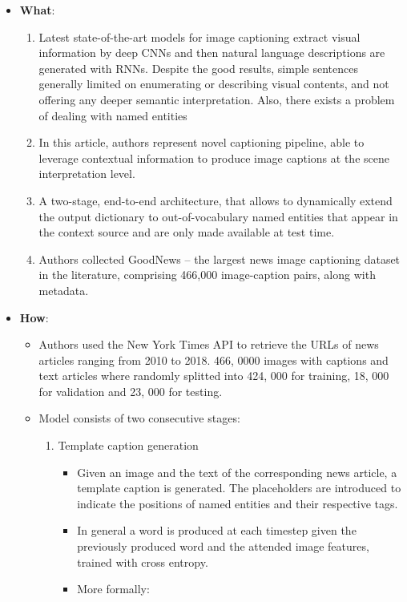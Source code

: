 \documentclass[11pt]{article}
\begin{document}
     \begin{itemize}
     	\item \textbf{What}:
       \begin{enumerate}
			\item Latest state-of-the-art models for image captioning extract visual information by deep CNNs and then natural language descriptions are generated with RNNs. Despite the good results, simple sentences generally limited on enumerating or describing visual contents, and not offering any deeper semantic interpretation. Also, there exists a problem of dealing with named entities
			\item In this article, authors represent novel captioning pipeline, able to leverage contextual information to produce image captions at the scene interpretation level.
			\item A two-stage, end-to-end architecture, that allows to dynamically extend the output dictionary to out-of-vocabulary named entities that appear in the context source and are only made available at test time.
			\item Authors collected GoodNews -- the largest news image captioning dataset in the literature, comprising 466,000 image-caption pairs, along with metadata. 
       \end{enumerate}
        \item \textbf{How}:
       \begin{itemize}
			\item  Authors used the New York Times API to retrieve the URLs of news articles ranging from 2010 to 2018. 466, 0000 images with captions and text articles where randomly splitted into 424, 000 for training, 18, 000 for validation and 23, 000 for testing. 
			\item Model consists of two consecutive stages:
			\begin{enumerate} 
				\item Template caption generation
					\begin{itemize}
						\item Given an image and the text of the corresponding news article, a template caption is generated. The placeholders are introduced to indicate the positions of named entities and their respective tags.
						\item In general a word is produced at each timestep given the previously produced word and the attended image features, trained with cross entropy.
						\item More formally:
        	

\end{itemize}
\end{enumerate}
\end{itemize}
\end{itemize}
\end{document}
